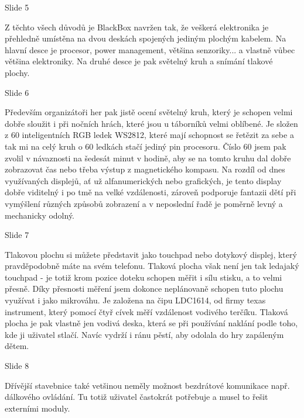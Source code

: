 
Slide 5 

Z těchto všech důvodů je BlackBox navržen tak, že  %
veškerá elektronika je přehledně umístěna na dvou deskách spojených jediným plochým kabelem.
Na hlavní desce je procesor, power management, většina
senzoriky... a vlastně vůbec většina elektroniky. Na druhé desce je pak světelný kruh
 a snímání tlakové plochy.
 
Slide 6

Především organizátoři her pak jistě ocení světelný kruh, který je schopen velmi dobře sloužit 
i při nočních hrách, které jsou u táborníků velmi oblíbené.
Je složen z 60 inteligentních RGB ledek WS2812, které mají schopnost se řetězit za sebe 
a tak mi na celý kruh o 60 ledkách stačí jediný pin procesoru. 
Číslo 60 jsem pak zvolil v návaznosti na šedesát minut v hodině, 
aby se na tomto kruhu dal dobře zobrazovat čas nebo třeba výstup z magnetického kompasu. 
Na rozdíl od dnes využívaných displejů, ať už alfanumerických nebo grafických, 
je tento display dobře viditelný i po tmě na velké vzdálenosti, 
zároveň podporuje fantazii dětí při vymýšlení různých způsobů zobrazení 
a v neposlední řadě je poměrně levný a mechanicky odolný. 


Slide 7

Tlakovou plochu si můžete představit jako touchpad nebo dotykový displej, který pravděpodobně máte na svém telefonu.
Tlaková plocha však není jen tak ledajaký touchpad -  je totiž krom pozice doteku 
schopen měřit i sílu stisku, a to velmi přesně.
Díky přesnosti měření jsem dokonce neplánovaně schopen tuto plochu využívat i jako mikrováhu. 
Je založena na čipu LDC1614, od firmy texas instrument, který
pomocí čtyř cívek měří vzdálenost vodivého terčíku. Tlaková plocha je pak vlastně 
jen vodivá deska, která se při používání naklání podle toho, kde ji uživatel stlačí.
Navíc vydrží i ránu pěstí, aby odolala do hry zapáleným dětem.

Slide 8

Dřívější stavebnice také vetšinou neměly možnost bezdrátové komunikace např. dálkového ovládání.
Tu totiž uživatel častokrát potřebuje a musel to řešit externími moduly.

